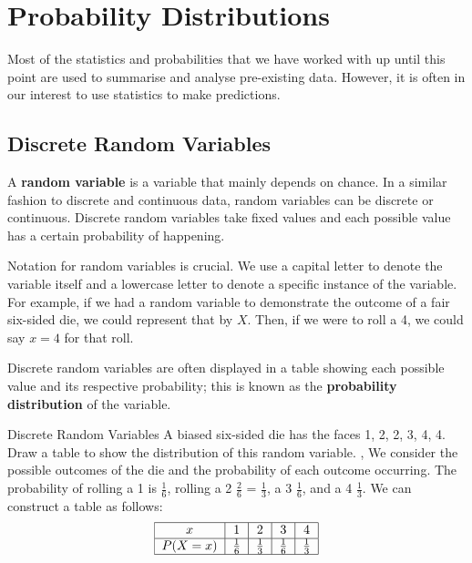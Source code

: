 \documentclass[../../main.tex]{subfiles}
\begin{document}
\chapter{Probability Distributions}

Most of the statistics and probabilities that we have worked with up until this point are used to summarise and analyse pre-existing data. However, it is often in our interest to use statistics to make predictions.

\section{Discrete Random Variables}
A \textbf{random variable} is a variable that mainly depends on chance. In a similar fashion to discrete and continuous data, random variables can be discrete or continuous. Discrete random variables take fixed values and each possible value has a certain probability of happening.

Notation for random variables is crucial. We use a capital letter to denote the variable itself and a lowercase letter to denote a specific instance of the variable. For example, if we had a random variable to demonstrate the outcome of a fair six-sided die, we could represent that by $X$. Then, if we were to roll a 4, we could say $x = 4$ for that roll.

Discrete random variables are often displayed in a table showing each possible value and its respective probability; this is known as the \textbf{probability distribution} of the variable.
\begin{example}{Discrete Random Variables}
A biased six-sided die has the faces 1, 2, 2, 3, 4, 4. Draw a table to show the distribution of this random variable.
\sep
We consider the possible outcomes of the die and the probability of each outcome occurring. The probability of rolling a 1 is $\frac{1}{6}$, rolling a 2 $\frac{2}{6}$ = $\frac{1}{3}$, a 3 $\frac{1}{6}$, and a 4 $\frac{1}{3}$.  We can construct a table as follows:
\begin{align}
\begin{tabular}{ |c|c|c|c|c| } 
 \hline
 $x$ & 1 & 2 & 3 & 4 \\ 
 \hline
 $P(X=x)$ & $\frac{1}{6}$ & $\frac{1}{3}$ & $\frac{1}{6}$ & $\frac{1}{3}$ \\ 
 \hline
\end{tabular}
\end{align}
\end{example}
\end{document}
